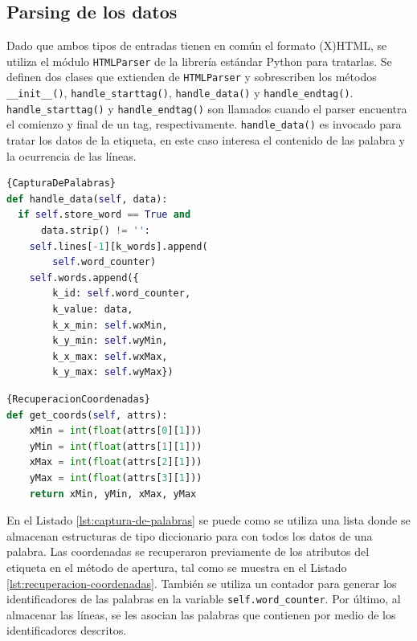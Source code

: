\subsection{Parsing de los datos}

Dado que ambos tipos de entradas tienen en común el formato (X)HTML, se utiliza el módulo \verb|HTMLParser| de la librería estándar Python para tratarlas. Se definen dos clases que extienden de \verb|HTMLParser| y sobrescriben los métodos \verb|__init__()|, \verb|handle_starttag()|, \verb|handle_data()| y \verb|handle_endtag()|. \verb|handle_starttag()| y \verb|handle_endtag()| son llamados cuando el parser encuentra el comienzo y final de un tag, respectivamente. \verb|handle_data()| es invocado para tratar los datos de la etiqueta, en este caso interesa el contenido de las palabra y la ocurrencia de las líneas.

\noindent\begin{minipage}{.45\textwidth}
    \begin{lstlisting}[language=Python,caption=Captura de las palabras.,frame=tlrb,label={lst:captura-de-palabras}]{CapturaDePalabras}
def handle_data(self, data):
  if self.store_word == True and 
      data.strip() != '':
    self.lines[-1][k_words].append(
        self.word_counter)
    self.words.append({
        k_id: self.word_counter,
        k_value: data,
        k_x_min: self.wxMin,
        k_y_min: self.wyMin,
        k_x_max: self.wxMax,
        k_y_max: self.wyMax})
    \end{lstlisting}
\end{minipage}\hfill
\begin{minipage}{.45\textwidth}
    \begin{lstlisting}[language=Python,caption=Recuperación de coordenadas.,frame=tlrb,label={lst:recuperacion-coordenadas}]{RecuperacionCoordenadas}
def get_coords(self, attrs):
    xMin = int(float(attrs[0][1]))
    yMin = int(float(attrs[1][1]))
    xMax = int(float(attrs[2][1]))
    yMax = int(float(attrs[3][1]))
    return xMin, yMin, xMax, yMax
    \end{lstlisting}
\end{minipage}

En el Listado \ref{lst:captura-de-palabras} se puede como se utiliza una lista donde se almacenan estructuras de tipo diccionario para con todos los datos de una palabra. Las coordenadas se recuperaron previamente de los atributos del etiqueta en el método de apertura, tal como se muestra en el Listado \ref{lst:recuperacion-coordenadas}. También se utiliza un contador para generar los identificadores de las palabras en la variable \verb|self.word_counter|. Por último, al almacenar las líneas, se les asocian las palabras que contienen por medio de los identificadores descritos. 

